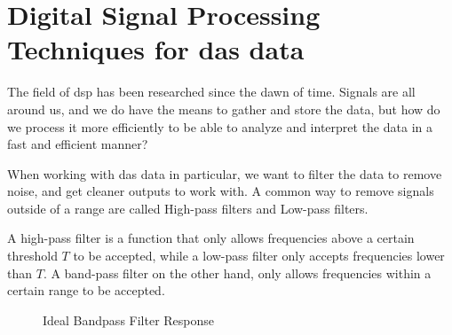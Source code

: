 \section{Digital Signal Processing Techniques for \acrshort{das} data}
\label{back:dsp}

The field of \acrshort{dsp} has been researched since the dawn of time. Signals are all around us, and we do have the means to gather and store the data, but how do we process it more efficiently to be able to analyze and interpret the data in a fast and efficient manner?

When working with \acrshort{das} data in particular, we want to filter the data to remove noise, and get cleaner outputs to work with. A common way to remove signals outside of a range are called High-pass filters and Low-pass filters. 

A high-pass filter is a function that only allows frequencies above a certain threshold $T$ to be accepted, while a low-pass filter only accepts frequencies lower than $T$. A band-pass filter on the other hand, only allows frequencies within a certain range to be accepted.




\begin{figure}[!h]
\centering
{}
\caption{Ideal Bandpass Filter Response}
\end{figure}


